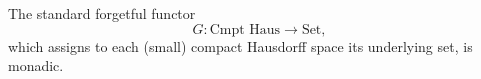 The standard forgetful functor
$$G: \text{Cmpt Haus} \rightarrow \text{Set},$$
which assigns to each (small) compact Hausdorff space its underlying set, is monadic.
